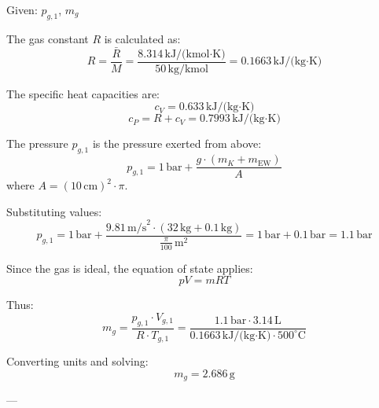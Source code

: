 Given: \( p_{g,1} \), \( m_g \)  

The gas constant \( R \) is calculated as:  
\[
R = \frac{\bar{R}}{M} = \frac{8.314 \, \text{kJ/(kmol·K)}}{50 \, \text{kg/kmol}} = 0.1663 \, \text{kJ/(kg·K)}
\]  

The specific heat capacities are:  
\[
c_V = 0.633 \, \text{kJ/(kg·K)}  
\]  
\[
c_P = R + c_V = 0.7993 \, \text{kJ/(kg·K)}
\]  

The pressure \( p_{g,1} \) is the pressure exerted from above:  
\[
p_{g,1} = 1 \, \text{bar} + \frac{g \cdot (m_K + m_{\text{EW}})}{A}
\]  
where \( A = (10 \, \text{cm})^2 \cdot \pi \).  

Substituting values:  
\[
p_{g,1} = 1 \, \text{bar} + \frac{9.81 \, \text{m/s}^2 \cdot (32 \, \text{kg} + 0.1 \, \text{kg})}{\frac{\pi}{100} \, \text{m}^2} = 1 \, \text{bar} + 0.1 \, \text{bar} = 1.1 \, \text{bar}
\]  

Since the gas is ideal, the equation of state applies:  
\[
pV = mRT
\]  

Thus:  
\[
m_g = \frac{p_{g,1} \cdot V_{g,1}}{R \cdot T_{g,1}} = \frac{1.1 \, \text{bar} \cdot 3.14 \, \text{L}}{0.1663 \, \text{kJ/(kg·K)} \cdot 500^\circ\text{C}}
\]  

Converting units and solving:  
\[
m_g = 2.686 \, \text{g}
\]  

---
